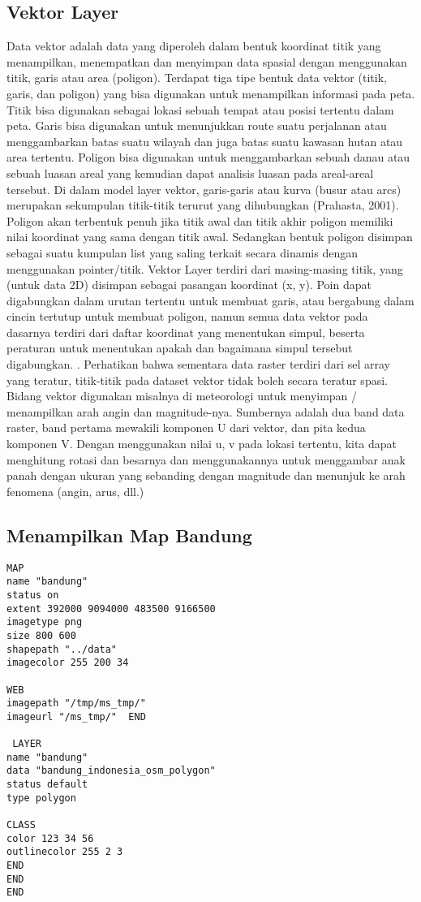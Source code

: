\subsection{Vektor Layer}
Data vektor adalah data yang diperoleh dalam bentuk koordinat titik yang menampilkan, 
menempatkan dan menyimpan data spasial dengan menggunakan titik, garis atau area (poligon). 
Terdapat tiga tipe bentuk data vektor (titik, garis, dan poligon) yang bisa digunakan untuk menampilkan informasi pada peta. 
Titik bisa digunakan sebagai lokasi sebuah tempat atau posisi tertentu dalam peta. 
Garis bisa digunakan untuk menunjukkan route suatu perjalanan atau menggambarkan batas suatu wilayah 
dan juga batas suatu kawasan hutan atau area tertentu. 
Poligon bisa digunakan untuk menggambarkan sebuah danau atau sebuah luasan areal yang kemudian dapat analisis luasan 
pada areal-areal tersebut.
Di dalam model layer vektor, garis-garis atau kurva (busur atau arcs) merupakan sekumpulan titik-titik terurut yang dihubungkan (Prahasta, 2001). Poligon akan terbentuk penuh jika titik awal dan titik akhir poligon memiliki nilai koordinat yang sama dengan titik awal. Sedangkan bentuk poligon disimpan sebagai suatu kumpulan list yang saling terkait secara dinamis dengan menggunakan pointer/titik.
Vektor Layer terdiri dari masing-masing titik, yang (untuk data 2D) disimpan sebagai pasangan koordinat (x, y). 
Poin dapat digabungkan dalam urutan tertentu untuk membuat garis, atau bergabung dalam cincin tertutup untuk 
membuat poligon, namun semua data vektor pada dasarnya terdiri dari daftar koordinat yang menentukan simpul, 
beserta peraturan untuk menentukan apakah dan bagaimana simpul tersebut digabungkan. .
Perhatikan bahwa sementara data raster terdiri dari sel array yang teratur, 
titik-titik pada dataset vektor tidak boleh secara teratur spasi.
Bidang vektor digunakan misalnya di meteorologi untuk menyimpan / menampilkan arah angin dan magnitude-nya.
Sumbernya adalah dua band data raster, band pertama mewakili komponen U dari vektor, dan pita kedua komponen V. Dengan menggunakan nilai u, v pada lokasi tertentu, kita dapat menghitung rotasi dan besarnya dan menggunakannya untuk menggambar anak panah dengan ukuran yang sebanding dengan magnitude dan menunjuk ke arah fenomena (angin, arus, dll.)

\subsection{Menampilkan Map Bandung}
\begin{verbatim}
MAP  
name "bandung"  
status on  
extent 392000 9094000 483500 9166500  
imagetype png  
size 800 600  
shapepath "../data"  
imagecolor 255 200 34      

WEB   
imagepath "/tmp/ms_tmp/"   
imageurl "/ms_tmp/"  END 
 
 LAYER   
name "bandung"   
data "bandung_indonesia_osm_polygon"   
status default   
type polygon 

CLASS    
color 123 34 56    
outlinecolor 255 2 3      
END    
END 
END
\end{verbatim}


